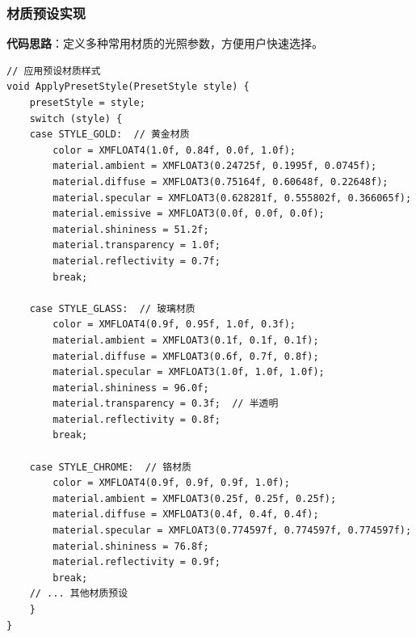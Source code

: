 \documentclass[12pt,a4paper]{article}
\begin{document}
\begin{tcolorbox}
\subsubsection{材质预设实现}

\textbf{代码思路}：定义多种常用材质的光照参数，方便用户快速选择。

\begin{lstlisting}[caption={材质预设应用函数}]
// 应用预设材质样式
void ApplyPresetStyle(PresetStyle style) {
    presetStyle = style;
    switch (style) {
    case STYLE_GOLD:  // 黄金材质
        color = XMFLOAT4(1.0f, 0.84f, 0.0f, 1.0f);
        material.ambient = XMFLOAT3(0.24725f, 0.1995f, 0.0745f);
        material.diffuse = XMFLOAT3(0.75164f, 0.60648f, 0.22648f);
        material.specular = XMFLOAT3(0.628281f, 0.555802f, 0.366065f);
        material.emissive = XMFLOAT3(0.0f, 0.0f, 0.0f);
        material.shininess = 51.2f;
        material.transparency = 1.0f;
        material.reflectivity = 0.7f;
        break;
        
    case STYLE_GLASS:  // 玻璃材质
        color = XMFLOAT4(0.9f, 0.95f, 1.0f, 0.3f);
        material.ambient = XMFLOAT3(0.1f, 0.1f, 0.1f);
        material.diffuse = XMFLOAT3(0.6f, 0.7f, 0.8f);
        material.specular = XMFLOAT3(1.0f, 1.0f, 1.0f);
        material.shininess = 96.0f;
        material.transparency = 0.3f;  // 半透明
        material.reflectivity = 0.8f;
        break;
        
    case STYLE_CHROME:  // 铬材质
        color = XMFLOAT4(0.9f, 0.9f, 0.9f, 1.0f);
        material.ambient = XMFLOAT3(0.25f, 0.25f, 0.25f);
        material.diffuse = XMFLOAT3(0.4f, 0.4f, 0.4f);
        material.specular = XMFLOAT3(0.774597f, 0.774597f, 0.774597f);
        material.shininess = 76.8f;
        material.reflectivity = 0.9f;
        break;
    // ... 其他材质预设
    }
}
\end{lstlisting}
\end{tcolorbox}
\end{document}
